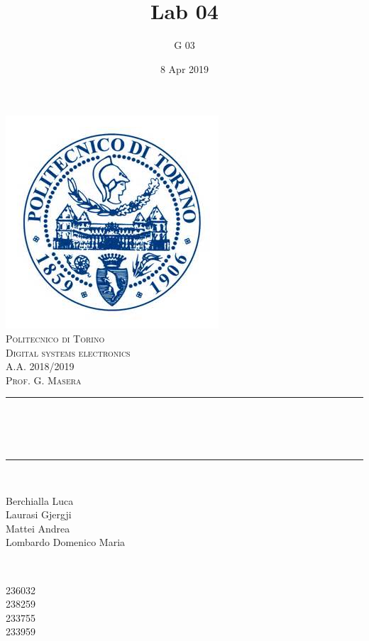 \documentclass[12pt]{article}
\title{Lab 04}													%
\author{G 03}														%
\date{8 Apr 2019}														%
\makeatletter
\let\thetitle\@title
\let\thedate\@date
\makeatother
\begin{document}

\begin{titlepage}
	\centering
    \vspace*{0.5 cm}
    \includegraphics[scale = 0.75]{polito.jpg}\\[1.0 cm]				%
    \textsc{\LARGE Politecnico di Torino}\\[2.0 cm]						%
	\textsc{\Large Digital systems electronics\\ A.A. 2018/2019}\\[0.5 cm]		%
	\textsc{\Large Prof. G. Masera}\\[0.5 cm]		%
	\rule{\linewidth}{0.2 mm} \\[0.4 cm]
	{ \huge \bfseries \thetitle \\ \small \thedate}\\
	\rule{\linewidth}{0.2 mm} \\[1.5 cm]
	
	\begin{minipage}{0.4\textwidth}
		\begin{flushleft} \large
			Berchialla Luca\\												%
			Laurasi Gjergji
			\\
			
			Mattei Andrea\\
            Lombardo Domenico Maria\\
            
			\end{flushleft}
			\end{minipage}~
			\begin{minipage}{0.4\textwidth}
            
			\begin{flushright} \large
			236032\\													%
			238259\\
            233755\\
            233959\\
            
		\end{flushright}
        
	\end{minipage}\\[2 cm]
	
\end{titlepage}
\end{document}
